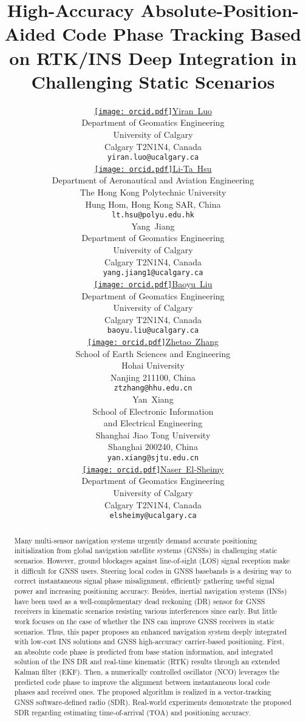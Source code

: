 \documentclass{article}
\title{High-Accuracy Absolute-Position-Aided Code Phase Tracking Based on RTK/INS Deep Integration in Challenging Static Scenarios}
\author{ \href{https://orcid.org/0000-0002-8112-4376}{\texttt{[image: orcid.pdf]}\hspace{1mm}Yiran~Luo}\\
	Department of Geomatics Engineering\\
	University of Calgary\\
	Calgary T2N1N4, Canada \\
	\texttt{yiran.luo@ucalgary.ca} \\
	\And
	\href{https://orcid.org/0000-0002-0352-741X}{\texttt{[image: orcid.pdf]}\hspace{1mm}Li-Ta~Hsu} \\
	Department of Aeronautical and Aviation Engineering\\
	The Hong Kong Polytechnic University\\
	Hung Hom, Hong Kong SAR, China \\
	\texttt{lt.hsu@polyu.edu.hk} \\
	\And
	{\hspace{1mm}Yang~Jiang} \\
	Department of Geomatics Engineering\\
	University of Calgary\\
	Calgary T2N1N4, Canada \\
	\texttt{yang.jiang1@ucalgary.ca} \\
	\And
	\href{https://orcid.org/0000-0003-1797-2941}{\texttt{[image: orcid.pdf]}\hspace{1mm}Baoyu~Liu} \\
	Department of Geomatics Engineering\\
	University of Calgary\\
	Calgary T2N1N4, Canada \\
	\texttt{baoyu.liu@ucalgary.ca} \\
	\And
	\href{https://orcid.org/0000-0002-0565-2038}{\texttt{[image: orcid.pdf]}\hspace{1mm}Zhetao~Zhang} \\
	School of Earth Sciences and Engineering\\
	Hohai University\\
	Nanjing 211100, China \\
	\texttt{ztzhang@hhu.edu.cn} \\
	\And
	{\hspace{1mm}Yan~Xiang} \\
	School of Electronic Information \\and Electrical Engineering\\
	Shanghai Jiao Tong University\\
	Shanghai 200240, China \\
	\texttt{yan.xiang@sjtu.edu.cn} \\
	\And
	\href{https://orcid.org/0000-0001-6505-0832}{\texttt{[image: orcid.pdf]}\hspace{1mm}Naser~El-Sheimy} \\
	Department of Geomatics Engineering\\
	University of Calgary\\
	Calgary T2N1N4, Canada \\
	\texttt{elsheimy@ucalgary.ca} \\
}
\begin{document}
\maketitle

\begin{abstract}
Many multi-sensor navigation systems urgently demand accurate positioning initialization from global navigation satellite systems (GNSSs) in challenging static scenarios. However, ground blockages against line-of-sight (LOS) signal reception make it difficult for GNSS users. Steering local codes in GNSS basebands is a desiring way to correct instantaneous signal phase misalignment, efficiently gathering useful signal power and increasing positioning accuracy. Besides, inertial navigation systems (INSs) have been used as a well-complementary dead reckoning (DR) sensor for GNSS receivers in kinematic scenarios resisting various interferences since early. But little work focuses on the case of whether the INS can improve GNSS receivers in static scenarios. Thus, this paper proposes an enhanced navigation system deeply integrated with low-cost INS solutions and GNSS high-accuracy carrier-based positioning. First, an absolute code phase is predicted from base station information, and integrated solution of the INS DR and real-time kinematic (RTK) results through an extended Kalman filter (EKF). Then, a numerically controlled oscillator (NCO) leverages the predicted code phase to improve the alignment between instantaneous local code phases and received ones. The proposed algorithm is realized in a vector-tracking GNSS software-defined radio (SDR). Real-world experiments demonstrate the proposed SDR regarding estimating time-of-arrival (TOA) and positioning accuracy. 
\end{abstract}


\end{document}

